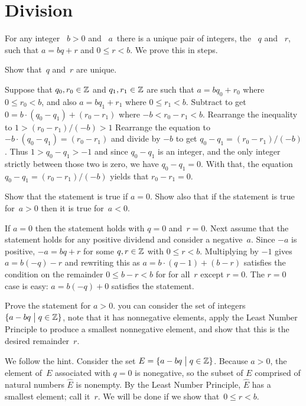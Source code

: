 \documentclass{ibl}  %
\begin{document}
\section{Division}
\begin{problem}  For any integer 
~$b>0$ and ~$a\,$ there is a unique pair of
integers, the ~$q$ and ~$r$,
such that $a=bq+r$ and $0\leq r<b$.
We prove this in steps.
\begin{exes} 
\begin{exercise}
  Show that~$q$ and~$r$ are unique.
\end{exercise}
\begin{answer}
  Suppose that $q_0,r_0\in\mathbb{Z}$ and $q_1,r_1\in\mathbb{Z}$ are such that
  $a=bq_0+r_0$ where $0\leq r_0<b$, and also
  $a=bq_1+r_1$ where $0\leq r_1<b$.
  Subtract to get $0=b\cdot(q_0-q_1)+(r_0-r_1)$ where $-b<r_0-r_1<b$.
  Rearrange the inequality to $1>(r_0-r_1)/(-b)>1$
  Rearrange the equation to $-b\cdot(q_0-q_1)=(r_0-r_1)$
  and divide by $-b$ to get $q_0-q_1=(r_0-r_1)/(-b)$.
  Thus  $1>q_0-q_1>-1$ and since $q_0-q_1$ is an integer, and
  the only integer strictly between those two is zero, we have $q_0-q_1=0$.
  With that, the equation $q_0-q_1=(r_0-r_1)/(-b)$ yields that $r_0-r_1=0$.
\end{answer}
\begin{exercise}
  Show that the statement is true if $a=0$.
  Show also that if the statement is true for~$a>0$ then it is true
  for~$a<0$.
\end{exercise} 
\begin{answer}
  If $a=0$ then the statement holds with $q=0$ and~$r=0$.
  Next assume that the statement holds for any positive dividend
  and consider a negative~$a$.
  Since $-a$ is positive, $-a=bq+r$ for some 
  $q,r\in\mathbb{Z}$ with $0\leq r<b$.
  Multiplying by $-1$ gives $a=b(-q)-r$ and
  rewriting this as $a=b\cdot(q-1)+(b-r)$ satisfies the condition on the
  remainder $0\leq b-r<b$ for for all~$r$ except $r=0$.
  The $r=0$ case is easy: $a=b(-q)+0$ satisfies the statement.   
\end{answer}
\begin{exercise} 
  Prove the statement for $a>0$.
  \hint you can consider the set of integers $\{a-bq \bigm| q\in\mathbb{Z}\}$,
  note that it has nonnegative elements,
  apply the Least Number Principle
  to produce a smallest nonnegative element, and show that this is the desired
  remainder~$r$.
\end{exercise}
\begin{answer}
  We follow the hint.
  Consider the set $E=\{a-bq \bigm| q\in\mathbb{Z}\}$.
  Because $a>0$, the element of~$E$ associated with $q=0$ is nonegative,
  so the subset of $E$ comprised of natural numbers $\hat{E}$ is nonempty.
  By the Least Number Principle, $\hat{E}$ has a smallest element;
  call it~$r$.
  We will be done if we show that~$0\leq r<b$.


\end{answer}
\end{exes}
\end{problem}
\end{document}
